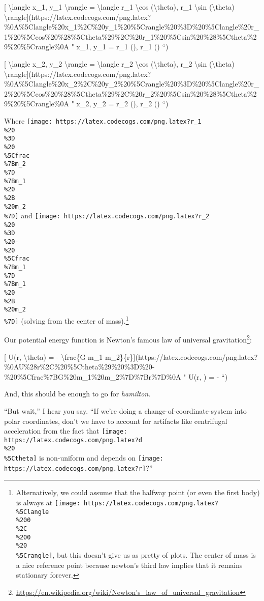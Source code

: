 \documentclass[]{article}
\renewcommand{\href}[2]{#2\footnote{\url{#1}}}
\begin{document}
{[} \textbackslash{}langle x\_1, y\_1 \textbackslash{}rangle =
\textbackslash{}langle r\_1 \textbackslash{}cos (\textbackslash{}theta), r\_1
\textbackslash{}sin (\textbackslash{}theta)
\textbackslash{}rangle{]}(https://latex.codecogs.com/png.latex?\%0A\%5Clangle\%20x\_1\%2C\%20y\_1\%20\%5Crangle\%20\%3D\%20\%5Clangle\%20r\_1\%20\%5Ccos\%20\%28\%5Ctheta\%29\%2C\%20r\_1\%20\%5Csin\%20\%28\%5Ctheta\%29\%20\%5Crangle\%0A
" \langle x\_1, y\_1 \rangle = \langle r\_1 \cos (\theta), r\_1 \sin (\theta)
\rangle ``)

{[} \textbackslash{}langle x\_2, y\_2 \textbackslash{}rangle =
\textbackslash{}langle r\_2 \textbackslash{}cos (\textbackslash{}theta), r\_2
\textbackslash{}sin (\textbackslash{}theta)
\textbackslash{}rangle{]}(https://latex.codecogs.com/png.latex?\%0A\%5Clangle\%20x\_2\%2C\%20y\_2\%20\%5Crangle\%20\%3D\%20\%5Clangle\%20r\_2\%20\%5Ccos\%20\%28\%5Ctheta\%29\%2C\%20r\_2\%20\%5Csin\%20\%28\%5Ctheta\%29\%20\%5Crangle\%0A
" \langle x\_2, y\_2 \rangle = \langle r\_2 \cos (\theta), r\_2 \sin (\theta)
\rangle ``)

Where
\texttt{[image: https://latex.codecogs.com/png.latex?r\_1\\\%20\\\%3D\\\%20\\\%5Cfrac\\\%7Bm\_2\\\%7D\\\%7Bm\_1\\\%20\\\%2B\\\%20m\_2\\\%7D]}
and
\texttt{[image: https://latex.codecogs.com/png.latex?r\_2\\\%20\\\%3D\\\%20-\\\%20\\\%5Cfrac\\\%7Bm\_1\\\%7D\\\%7Bm\_1\\\%20\\\%2B\\\%20m\_2\\\%7D]}
(solving from the center of mass).\footnote{Alternatively, we could assume that
  the halfway point (or even the first body) is always at
  \texttt{[image: https://latex.codecogs.com/png.latex?\\\%5Clangle\\\%200\\\%2C\\\%200\\\%20\\\%5Crangle]},
  but this doesn't give us as pretty of plots. The center of mass is a nice
  reference point because newton's third law implies that it remains stationary
  forever.}

Our potential energy function is Newton's famous
\href{https://en.wikipedia.org/wiki/Newton's_law_of_universal_gravitation}{law
of universal gravitation}:

{[} U(r, \textbackslash{}theta) = - \textbackslash{}frac\{G m\_1
m\_2\}\{r\}{]}(https://latex.codecogs.com/png.latex?\%0AU\%28r\%2C\%20\%5Ctheta\%29\%20\%3D\%20-\%20\%5Cfrac\%7BG\%20m\_1\%20m\_2\%7D\%7Br\%7D\%0A
" U(r, \theta) = -  ``)

And, this should be enough to go for \emph{hamilton}.

``But wait,'' I hear you say. ``If we're doing a change-of-coordinate-system
into polar coordinates, don't we have to account for artifacts like centrifugal
acceleration from the fact that
\texttt{[image: https://latex.codecogs.com/png.latex?d\\\%20\\\%5Ctheta]} is
non-uniform and depends on
\texttt{[image: https://latex.codecogs.com/png.latex?r]}?''
\end{document}
